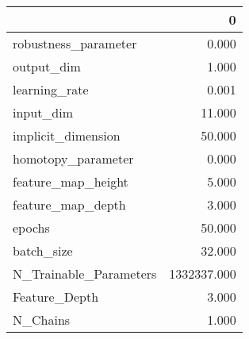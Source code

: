 \begin{tabular}{lr}
\toprule
{} &            0 \\
\midrule
robustness\_parameter   &        0.000 \\
output\_dim             &        1.000 \\
learning\_rate          &        0.001 \\
input\_dim              &       11.000 \\
implicit\_dimension     &       50.000 \\
homotopy\_parameter     &        0.000 \\
feature\_map\_height     &        5.000 \\
feature\_map\_depth      &        3.000 \\
epochs                 &       50.000 \\
batch\_size             &       32.000 \\
N\_Trainable\_Parameters &  1332337.000 \\
Feature\_Depth          &        3.000 \\
N\_Chains               &        1.000 \\
\bottomrule
\end{tabular}

